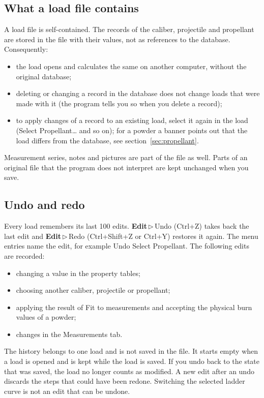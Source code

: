 \documentclass[11pt,a4paper]{article}
\newcommand{\ui}[1]{\textsf{#1}}
\newcommand{\menu}[1]{\textsf{\textbf{#1}}}
\newcommand{\sep}{\,$\triangleright$\,}
\begin{document}
\subsection{What a load file contains}
A load file is self-contained. The records of the caliber, projectile and propellant are stored in the file with their values, not as references to the
database. Consequently:
\begin{itemize}
  \item the load opens and calculates the same on another computer, without the original database;
  \item deleting or changing a record in the database does not change loads that were made with it (the program tells you so when you delete a record);
  \item to apply changes of a record to an existing load, select it again in the load (\ui{Select Propellant\dots} and so on); for a powder
        a banner points out that the load differs from the database, see section~\ref{sec:propellant}.
\end{itemize}
Measurement series, notes and pictures are part of the file as well. Parts of an original file that the program does not interpret are kept unchanged when you save.

\subsection{Undo and redo}\label{sec:undo}
Every load remembers its last 100 edits. \menu{Edit}\sep\ui{Undo} (Ctrl+Z) takes back the last edit and \menu{Edit}\sep\ui{Redo} (Ctrl+Shift+Z or Ctrl+Y) restores it again.
The menu entries name the edit, for example \ui{Undo Select Propellant}. The following edits are recorded:
\begin{itemize}
  \item changing a value in the property tables;
  \item choosing another caliber, projectile or propellant;
  \item applying the result of \ui{Fit to measurements} and accepting the physical burn values of a powder;
  \item changes in the \ui{Measurements} tab.
\end{itemize}
The history belongs to one load and is not saved in the file. It starts empty when a load is opened and is kept while the load is saved. If you undo back to the
state that was saved, the load no longer counts as modified. A new edit after an undo discards the steps that could have been redone.
Switching the selected ladder curve is not an edit that can be undone.
\end{document}
